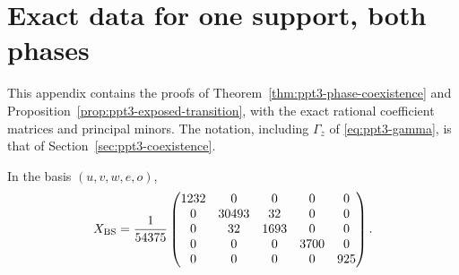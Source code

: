 \section{Exact data for one support, both phases}\label{sec:ppt3-app-coexistence}

This appendix contains the proofs of Theorem~\ref{thm:ppt3-phase-coexistence} and
Proposition~\ref{prop:ppt3-exposed-transition}, with the exact rational coefficient matrices and principal minors. The
notation, including $\Gamma_z$ of \eqref{eq:ppt3-gamma}, is that of Section~\ref{sec:ppt3-coexistence}.

In the basis $(u,v,w,e,o)$,
\begin{equation}\label{eq:ppt3-bs-same-support}
 X_{\rm BS}=\frac1{54375}
 \begin{pmatrix}
 1232&0&0&0&0\\
 0&30493&32&0&0\\
 0&32&1693&0&0\\
 0&0&0&3700&0\\
 0&0&0&0&925
 \end{pmatrix}.
\end{equation}

